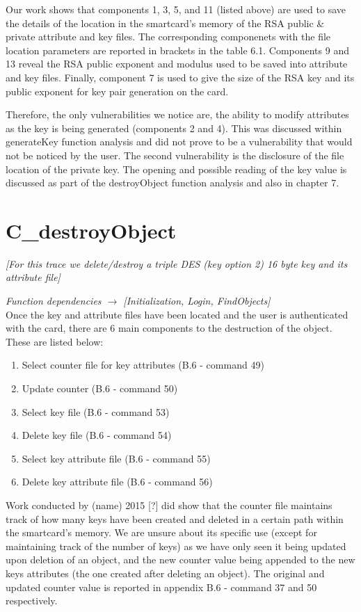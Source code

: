 \documentclass[bsc,frontabs,twoside,singlespacing,parskip,deptreport]{infthesis}     %
\begin{document}
Our work shows that components 1, 3, 5, and 11 (listed above) are used to save the details of the location in the smartcard's memory of the RSA public \& private attribute and key files. The corresponding componenets with the file location parameters are reported in brackets in the table 6.1. Components 9 and 13 reveal the RSA public exponent and modulus used to be saved into attribute and key files. Finally, component 7 is used to give the size of the RSA key and its public exponent for key pair generation on the card.

Therefore, the only vulnerabilities we notice are, the ability to modify attributes as the key is being generated (components 2 and 4). This was discussed within generateKey function analysis and did not prove to be a vulnerability that would not be noticed by the user. The second vulnerability is the disclosure of the file location of the private key. The opening and possible reading of the key value is discussed as part of the destroyObject function analysis and also in chapter 7.

\section{C\_destroyObject}
\textit{[For this trace we delete/destroy a triple DES (key option 2) 16 byte key and its attribute file]}

\textit{Function dependencies $\rightarrow$ [Initialization, Login, FindObjects]}\\

Once the key and attribute files have been located and the user is authenticated with the card, there are 6 main components to the destruction of the object. These are listed below:\\

\begin{enumerate}
\item Select counter file for key attributes (B.6 - command 49)
\item Update counter (B.6 - command 50)
\item Select key file (B.6 - command 53)
\item Delete key file (B.6 - command 54)
\item Select key attribute file (B.6 - command 55)
\item Delete key attribute file (B.6 - command 56)
\end{enumerate}

Work conducted by (name) 2015 [?] did show that the counter file maintains track of how many keys have been created and deleted in a certain path within the smartcard's memory. We are unsure about its specific use (except for maintaining track of the number of keys) as we have only seen it being updated upon deletion of an object, and the new counter value being appended to the new keys attributes (the one created after deleting an object). The original and updated counter value is reported in appendix B.6 - command 37 and 50 respectively.
\end{document}

